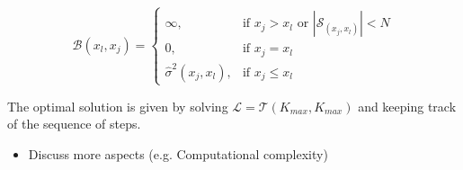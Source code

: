 \documentclass[twoside]{article}
\begin{document}
\begin{equation}
  \label{eq:cost_step}
  \mathcal{B}(x_l, x_j) = \begin{cases}
                            \infty, & \text{if $x_j > x_l$ or \(|\mathcal{S}_{(x_j, x_l)}| < N\)}\\
                            0, & \text{if $x_j = x_l$}\\
                            \hat{\sigma}^2(x_j, x_l), &\text{if $x_j \leq x_l$}
  \end{cases}
\end{equation}

The optimal solution is given by solving
\(\mathcal{L} = \mathcal{T}(K_{max}, K_{max})\) and keeping track of the sequence of
steps. 

\noindent

\begin{itemize}
\item Discuss more aspects (e.g. Computational complexity)
\end{itemize}
\end{document}
